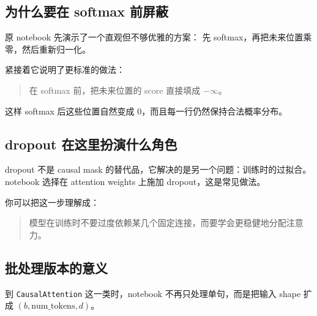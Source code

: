 \documentclass[12pt,a4paper]{ctexart}
\newcommand{\code}[1]{\texttt{#1}}
\begin{document}
\begin{center}
\end{center}

\subsection{为什么要在 softmax 前屏蔽}

原 notebook 先演示了一个直观但不够优雅的方案：
先 softmax，再把未来位置乘零，然后重新归一化。

紧接着它说明了更标准的做法：

\begin{quote}
在 softmax 前，把未来位置的 score 直接填成 \(-\infty\)。
\end{quote}

这样 softmax 后这些位置自然变成 0，而且每一行仍然保持合法概率分布。

\subsection{dropout 在这里扮演什么角色}

dropout 不是 causal mask 的替代品，它解决的是另一个问题：训练时的过拟合。
notebook 选择在 attention weights 上施加 dropout，这是常见做法。

你可以把这一步理解成：

\begin{quote}
模型在训练时不要过度依赖某几个固定连接，而要学会更稳健地分配注意力。
\end{quote}

\subsection{批处理版本的意义}

到 \code{CausalAttention} 这一类时，notebook 不再只处理单句，而是把输入 shape 扩成
\((b, \text{num\_tokens}, d)\)。
\end{document}
